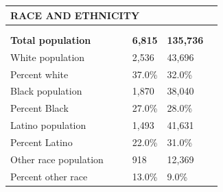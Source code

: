 \documentclass[9pt]{report}
\begin{document}
\vspace{12pt}
\setlength{\tabcolsep}{.01in} %
\begin{tabular}{p{.10in}p{.10in}p{.10in}p{3.7in}>{\hfill}p{.85in}>{\hfill}p{.85in}>{\hfill}p{.85in}>{\hfill}p{.85in}p{0.1in}}
\multicolumn{9}{l}{\parbox{7.1in}{\raggedright{\large{\strut\textbf{RACE AND ETHNICITY}\strut}}}} \\ 
\hline
\multicolumn{4}{l}{\parbox{3.5in}{\raggedright{\textbf{}}}} & \multicolumn{1}{r}{\parbox{.85in}{\strut\raggedleft{\textbf{}\strut}}} & \multicolumn{1}{r}{\parbox{.85in}{\strut\raggedleft{\textbf{}\strut}}} & \multicolumn{1}{r}{\parbox{.85in}{\strut{}}} & \multicolumn{1}{r}{\parbox{.85in}{\strut{}}} & \\ 
\multicolumn{9}{l}{} \\ 
\multicolumn{4}{l}{\parbox{3.5in}{\strut\raggedright{\textbf{Total population}\strut}}} & \textbf{} & \textbf{} & \textbf{6,815} & \textbf{135,736} & \textbf{} \\ 
\multicolumn{4}{l}{\parbox{3.6in}{\strut\raggedright{{White population}}\strut}} &  &  & 2,536 & 43,696 & \multicolumn{1}{l}{}  \\ 
\multicolumn{4}{l}{\parbox{3.6in}{\strut\raggedright{{Percent white}}\strut}} &  &  & 37.0\% & 32.0\% & \multicolumn{1}{l}{}  \\ 
\multicolumn{4}{l}{\parbox{3.6in}{\strut\raggedright{{Black population}}\strut}} &  &  & 1,870 & 38,040 & \multicolumn{1}{l}{}  \\ 
\multicolumn{4}{l}{\parbox{3.6in}{\strut\raggedright{{Percent Black}}\strut}} &  &  & 27.0\% & 28.0\% & \multicolumn{1}{l}{}  \\ 
\multicolumn{4}{l}{\parbox{3.6in}{\strut\raggedright{{Latino population}}\strut}} &  &  & 1,493 & 41,631 & \multicolumn{1}{l}{}  \\ 
\multicolumn{4}{l}{\parbox{3.6in}{\strut\raggedright{{Percent Latino}}\strut}} &  &  & 22.0\% & 31.0\% & \multicolumn{1}{l}{}  \\ 
\multicolumn{4}{l}{\parbox{3.6in}{\strut\raggedright{{Other race population}}\strut}} &  &  & 918 & 12,369 & \multicolumn{1}{l}{}  \\ 
\multicolumn{4}{l}{\parbox{3.6in}{\strut\raggedright{{Percent other race}}\strut}} &  &  & 13.0\% & 9.0\% & \multicolumn{1}{l}{}  \\ 

\end{tabular}
\setlength{\tabcolsep}{6pt} %
\end{document}
